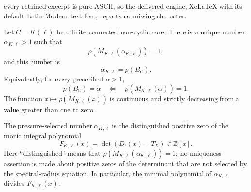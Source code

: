 \documentclass[10pt,a4paper]{amsart}
\newcommand{\ZZ}{\mathbb Z}
\begin{document}
every retained excerpt is pure ASCII, so the delivered engine, XeLaTeX with its default Latin Modern text font, reports no missing character.
\begin{theorem}\label{thm:kernel-pressure}
Let \(C=K(\ell)\) be a finite connected non-cyclic core.  There is a unique
number \(\alpha_{K,\ell}>1\) such that
\begin{equation}\label{eq:kernel-pressure-defined}
  \rho\!\left(M_{K,\ell}(\alpha_{K,\ell})\right)=1,
\end{equation}
and this number is
\[
  \alpha_{K,\ell}=\rho(B_C).
\]
Equivalently, for every prescribed \(\alpha>1\),
\begin{equation}\label{eq:kernel-pressure}
  \rho(B_C)=\alpha
  \quad\Longleftrightarrow\quad
  \rho\!\left(M_{K,\ell}(\alpha)\right)=1.
\end{equation}
The function \(x\mapsto\rho(M_{K,\ell}(x))\) is continuous and strictly
decreasing from a value greater than one to zero.

The pressure-selected number \(\alpha_{K,\ell}\) is the distinguished
positive zero of the monic integral polynomial
\begin{equation}\label{eq:kernel-polynomial}
  F_{K,\ell}(x)
  =\det\!\left(D_\ell(x)-T_K\right)\in\ZZ[x].
\end{equation}
Here ``distinguished'' means that
\(\rho(M_{K,\ell}(\alpha_{K,\ell}))=1\); no uniqueness assertion is made
about positive zeros of the determinant that are not selected by the
spectral-radius equation.  In particular, the minimal polynomial of
\(\alpha_{K,\ell}\) divides
\(F_{K,\ell}(x)\).
\end{theorem}
\end{document}
